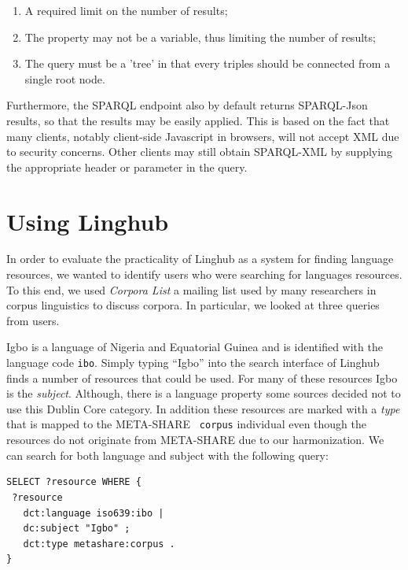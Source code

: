 \documentclass{acm_proc_article-sp}
\begin{document}
\begin{enumerate}
    \item A required limit on the number of results;
    \item The property may not be a variable, thus limiting the number of
        results;
    \item The query must be a 'tree' in that every triples should be connected
        from a single root node.
\end{enumerate}

Furthermore, the SPARQL endpoint also by default returns SPARQL-Json
results\cite{}, so that the results may be easily applied. This is based on the
fact that many clients, notably client-side Javascript in browsers, will not
accept XML due to security concerns. Other clients may still obtain SPARQL-XML
by supplying the appropriate header or parameter in the query.

\section{Using Linghub}

In order to evaluate the practicality of Linghub as a system for finding
language resources, we wanted to identify users who were searching for languages
resources. To this end, we used \emph{Corpora List} a mailing list used by many
researchers in corpus linguistics to discuss corpora. In particular, we looked
at three queries from users.


Igbo is a language of Nigeria and Equatorial Guinea and is identified with the
language code {\tt ibo}. Simply typing ``Igbo'' into the search interface of
Linghub finds a number of resources that could be used. For many of these
resources Igbo is the \emph{subject}. Although, there is a language property
some sources decided not to use this Dublin Core category. In addition these
resources are marked with a \emph{type} that is mapped to the META-SHARE {\tt
corpus} individual even though the resources do not originate from META-SHARE
due to our harmonization. We can search for
both language and subject with the following query:

\begin{verbatim}
SELECT ?resource WHERE {
 ?resource
   dct:language iso639:ibo |
   dc:subject "Igbo" ;
   dct:type metashare:corpus .
}
\end{verbatim}
\end{document}
